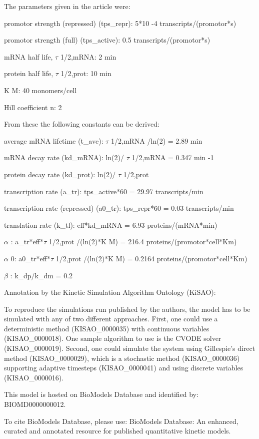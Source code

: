 \documentclass{article}
\begin{document}
The parameters given in the article were:

promotor strength (repressed) (tps\_repr): 5*10 -4 transcripts/(promotor*s)

promotor strength (full) (tps\_active): 0.5 transcripts/(promotor*s)

mRNA half life, \ensuremath{\tau} 1/2,mRNA: 2 min

protein half life, \ensuremath{\tau} 1/2,prot: 10 min

K M: 40 monomers/cell

Hill coefficient n: 2

From these the following constants can be derived:

average mRNA lifetime (t\_ave): \ensuremath{\tau} 1/2,mRNA /ln(2) = 2.89 min

mRNA decay rate (kd\_mRNA): ln(2)/ \ensuremath{\tau} 1/2,mRNA = 0.347 min -1

protein decay rate (kd\_prot): ln(2)/ \ensuremath{\tau} 1/2,prot

transcription rate (a\_tr): tps\_active*60 = 29.97 transcripts/min

transcription rate (repressed) (a0\_tr): tps\_repr*60 = 0.03 transcripts/min

translation rate (k\_tl): eff*kd\_mRNA = 6.93 proteins/(mRNA*min)

\ensuremath{\alpha} : a\_tr*eff*\ensuremath{\tau} 1/2,prot /(ln(2)*K M) = 216.4 proteins/(promotor*cell*Km)

\ensuremath{\alpha} 0: a0\_tr*eff*\ensuremath{\tau} 1/2,prot /(ln(2)*K M) = 0.2164 proteins/(promotor*cell*Km)

\ensuremath{\beta} : k\_dp/k\_dm = 0.2

Annotation by the Kinetic Simulation Algorithm Ontology (KiSAO):

To reproduce the simulations run published by the authors, the model has to be simulated with any of two different approaches. First, one could use a deterministic method (KISAO\_0000035) with continuous variables (KISAO\_0000018). One sample algorithm to use is the CVODE solver (KISAO\_0000019). Second, one could simulate the system using Gillespie's direct method (KISAO\_0000029), which is a stochastic method (KISAO\_0000036) supporting adaptive timesteps (KISAO\_0000041) and using discrete variables (KISAO\_0000016).

This model is hosted on BioModels Database and identified by: BIOMD0000000012.

To cite BioModels Database, please use: BioModels Database: An enhanced, curated and annotated resource for published quantitative kinetic models.
\end{document}
